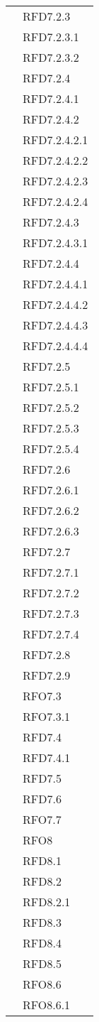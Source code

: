 \begin{longtable}{|>{\centering}m{10cm}|m{3cm}<{\centering}|}
& RFD7.2.3\\
& RFD7.2.3.1\\
& RFD7.2.3.2\\
& RFD7.2.4\\
& RFD7.2.4.1\\
& RFD7.2.4.2\\
& RFD7.2.4.2.1\\
& RFD7.2.4.2.2\\
& RFD7.2.4.2.3\\
& RFD7.2.4.2.4\\
& RFD7.2.4.3\\
& RFD7.2.4.3.1\\
& RFD7.2.4.4\\
& RFD7.2.4.4.1\\
& RFD7.2.4.4.2\\
& RFD7.2.4.4.3\\
& RFD7.2.4.4.4\\
& RFD7.2.5\\
& RFD7.2.5.1\\
& RFD7.2.5.2\\
& RFD7.2.5.3\\
& RFD7.2.5.4\\
& RFD7.2.6\\
& RFD7.2.6.1\\
& RFD7.2.6.2\\
& RFD7.2.6.3\\
& RFD7.2.7\\
& RFD7.2.7.1\\
& RFD7.2.7.2\\
& RFD7.2.7.3\\
& RFD7.2.7.4\\
& RFD7.2.8\\
& RFD7.2.9\\
& RFO7.3\\
& RFO7.3.1\\
& RFD7.4\\
& RFD7.4.1\\
& RFD7.5\\
& RFD7.6\\
& RFO7.7\\
& RFO8\\
& RFD8.1\\
& RFD8.2\\
& RFD8.2.1\\
& RFD8.3\\
& RFD8.4\\
& RFD8.5\\
& RFO8.6\\
& RFO8.6.1\\

\end{longtable}
